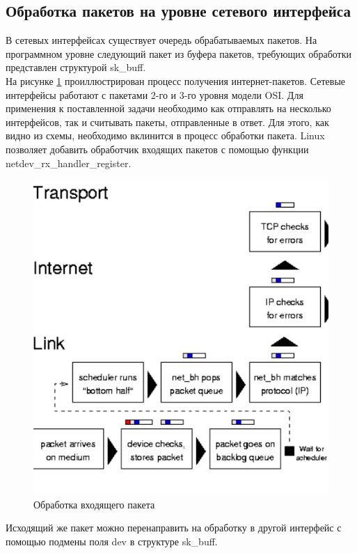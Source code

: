 \documentclass[14pt, a4paper]{extarticle}
\begin{document}
\subsection{Обработка пакетов на уровне сетевого интерфейса}
В сетевых интерфейсах существует очередь обрабатываемых пакетов.  На программном уровне следующий пакет из буфера пакетов, требующих обработки представлен структурой sk\_buff. \\
\indent На рисунке \ref{rx} проиллюстрирован процесс получения интернет-пакетов. Сетевые интерфейсы работают с пакетами 2-го и 3-го уровня модели OSI. Для применения к поставленной задачи необходимо как отправлять на несколько интерфейсов, так и считывать пакеты, отправленные в ответ. Для этого, как видно из схемы, необходимо вклинится в процесс обработки пакета. Linux позволяет добавить обработчик входящих пакетов с помощью функции netdev\_rx\_handler\_register.
\begin{figure}[H]
	\centering
	\includegraphics[scale=0.9]{r_rx.png}
	\caption{Обработка входящего пакета}
	\label{rx}
\end{figure}
\indent Исходящий же пакет можно перенаправить на обработку в другой интерфейс с помощью подмены поля dev в структуре sk\_buff.
\end{document}
